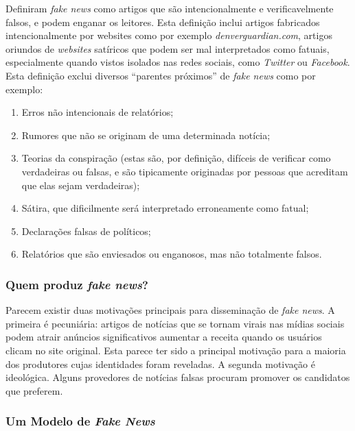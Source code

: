 \cite{allcot2017} Definiram  \textit{fake news} como artigos que são intencionalmente e verificavelmente falsos, e podem enganar os leitores. 
Esta definição inclui  artigos fabricados intencionalmente por websites como por exemplo \textit{denverguardian.com},  artigos oriundos de \textit{websites} satíricos que podem ser mal interpretados como fatuais, especialmente quando vistos isolados nas redes sociais, como  \textit{Twitter} ou \textit{Facebook}. Esta definição exclui diversos ``parentes próximos'' de \textit{fake news} como por exemplo:

\begin{enumerate}
    \item Erros não intencionais de relatórios;
    \item Rumores que não se originam de uma determinada notícia;
    \item Teorias da conspiração (estas são, por definição, difíceis de verificar como verdadeiras ou falsas, e são tipicamente originadas por pessoas que acreditam que elas sejam verdadeiras);
    \item Sátira, que dificilmente será interpretado erroneamente como fatual;
    \item Declarações falsas de políticos;
    \item Relatórios que são enviesados ou enganosos, mas não totalmente falsos.
\end{enumerate}


\subsubsection{Quem produz \textit{fake news}?}

Parecem existir duas motivações principais para disseminação de \textit{fake news}. 
A primeira é pecuniária: artigos de notícias que se tornam virais nas mídias sociais podem atrair anúncios significativos aumentar a receita quando os usuários clicam no site original. 
Esta parece ter sido a principal motivação para a maioria dos produtores cujas identidades foram reveladas. 
A segunda motivação é ideológica. 
Alguns provedores de notícias falsas procuram promover os candidatos que preferem.


\subsubsection{Um Modelo de \textit{Fake News}}


